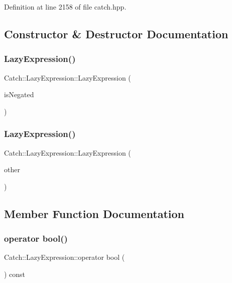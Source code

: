 Definition at line 2158 of file catch.\+hpp.



\subsection{Constructor \& Destructor Documentation}
\mbox{\label{class_catch_1_1_lazy_expression_a47186c2487bd4bf871e870ba8048553a}} 
\subsubsection{LazyExpression()\hspace{0.1cm}{\footnotesize\ttfamily [1/2]}}
{\footnotesize\ttfamily Catch\+::\+Lazy\+Expression\+::\+Lazy\+Expression (\begin{DoxyParamCaption}\item[{bool}]{is\+Negated }\end{DoxyParamCaption})}

\mbox{\label{class_catch_1_1_lazy_expression_ab82d5e94df0e159b018fbde0170e46f8}} 
\subsubsection{LazyExpression()\hspace{0.1cm}{\footnotesize\ttfamily [2/2]}}
{\footnotesize\ttfamily Catch\+::\+Lazy\+Expression\+::\+Lazy\+Expression (\begin{DoxyParamCaption}\item[{\textbf{ Lazy\+Expression} const \&}]{other }\end{DoxyParamCaption})}



\subsection{Member Function Documentation}
\mbox{\label{class_catch_1_1_lazy_expression_acdb846cb230cecfc6aca7a925b31fbca}} 
\subsubsection{operator bool()}
{\footnotesize\ttfamily Catch\+::\+Lazy\+Expression\+::operator bool (\begin{DoxyParamCaption}{ }\end{DoxyParamCaption}) const\hspace{0.3cm}{\ttfamily [explicit]}}

